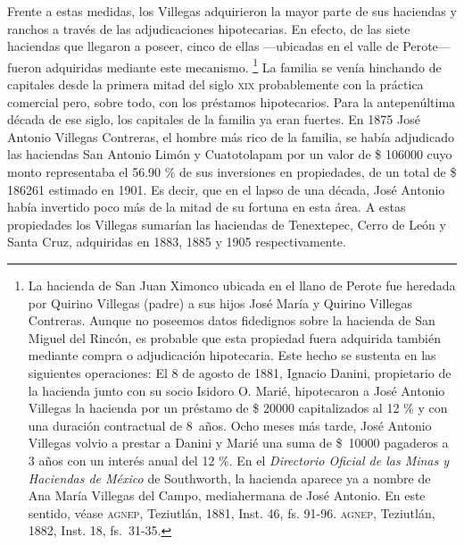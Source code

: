\documentclass[14pt,twoside,final]{extbook} %
\let\oldfootnote\footnote
\renewcommand\footnote[1]{%
\oldfootnote{\hspace{1mm}#1}}
\begin{document}
Frente a estas medidas, los Villegas adquirieron la mayor parte de sus haciendas y ranchos a través de las adjudicaciones hipotecarias. En efecto, de las siete haciendas que llegaron a poseer, cinco de ellas ---ubicadas en el valle de Perote--- fueron adquiridas mediante este mecanismo.\footnote{La hacienda de San Juan Ximonco ubicada en el llano de Perote fue heredada por Quirino Villegas
(padre) a sus hijos José María y Quirino Villegas Contreras. Aunque no poseemos datos fidedignos
sobre la hacienda de San Miguel del Rincón, es probable que esta propiedad fuera adquirida también
mediante compra o adjudicación hipotecaria. Este hecho se sustenta en las siguientes operaciones:
El 8 de agosto de 1881, Ignacio Danini, propietario de la hacienda junto con su socio Isidoro O.
Marié, hipotecaron a José Antonio Villegas la hacienda por un préstamo de \$ 20000
capitalizados al 12 \% y con una duración contractual de 8~años. Ocho meses más tarde, José
Antonio Villegas volvio a prestar a Danini y Marié una suma de \$~10000 pagaderos a 3 años
con un interés anual del 12 \%. En el \emph{Directorio Oficial de las Minas y Haciendas de México} de Southworth, la hacienda aparece ya a nombre de Ana María Villegas del Campo, mediahermana de José Antonio. En este sentido, véase \textsc{agnep}, Teziutlán, 1881, Inst. 46, fs. 91-96. \textsc{agnep}, Teziutlán, 1882, Inst. 18, fs.~31-35.} La familia se venía hinchando de capitales desde la primera mitad del siglo \textsc{xix} probablemente con la práctica comercial pero, sobre todo, con los préstamos hipotecarios. Para la antepenúltima década de ese siglo, los capitales de la familia ya eran fuertes. En 1875 José Antonio Villegas Contreras, el hombre más rico de la familia, se había adjudicado las haciendas San Antonio Limón y Cuatotolapam por un valor de \$ 106000 cuyo monto representaba el 56.90 \% de sus inversiones en propiedades, de un total de \$ 186261 estimado en 1901. Es decir, que en el lapso de una década, José Antonio había invertido poco más de la mitad de su fortuna en esta área. A estas propiedades los Villegas sumarían las haciendas de Tenextepec, Cerro de León y Santa Cruz, adquiridas en 1883, 1885 y 1905 respectivamente.
\end{document}
